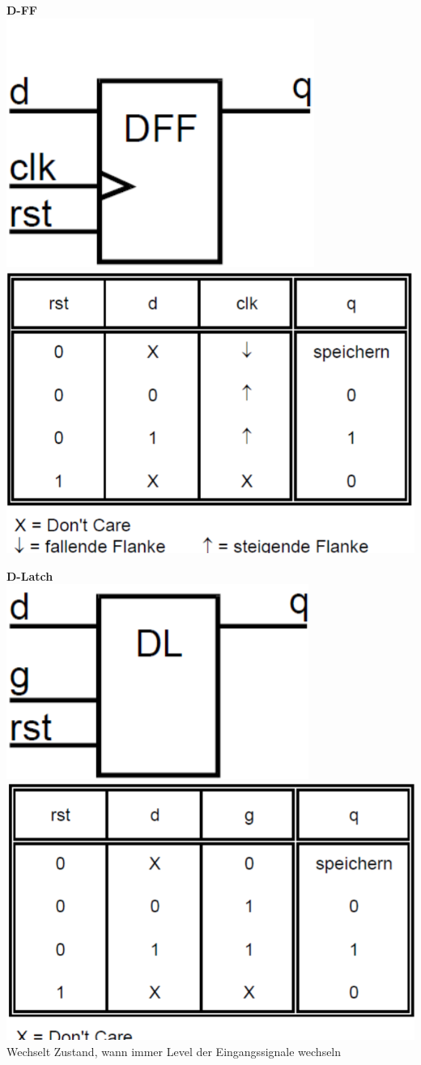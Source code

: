 		\begin{multicols}{3}
			\textbf{D-FF}\\
			\includegraphics[width=0.2\columnwidth]{pics/d_flipflopO.png}
			\includegraphics[width=0.78\columnwidth]{pics/d_flipflop.png}\\
			\columnbreak
			
			\textbf{D-Latch}\\
			\includegraphics[width=0.2\columnwidth]{pics/d_latchO.png}
			\includegraphics[width=0.78\columnwidth]{pics/d_latch.png}\\
			Wechselt Zustand, wann immer Level der Eingangssignale wechseln
			\columnbreak
			

\end{multicols}
